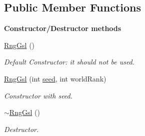 \subsection*{Public Member Functions}
\begin{Indent}{\bf Constructor/\-Destructor methods}\par
\begin{DoxyCompactItemize}
\item 
\hyperlink{class_q_u_e_s_o_1_1_rng_gsl_ace5a0dca9aa1655c3560602594b17074}{Rng\-Gsl} ()
\begin{DoxyCompactList}\small\item\em Default Constructor\-: it should not be used. \end{DoxyCompactList}\item 
\hyperlink{class_q_u_e_s_o_1_1_rng_gsl_a719078b54d621d51348b02c1fcac80c1}{Rng\-Gsl} (int \hyperlink{class_q_u_e_s_o_1_1_rng_base_a3094da86084e56faaae9325f1117f9a3}{seed}, int world\-Rank)
\begin{DoxyCompactList}\small\item\em Constructor with seed. \end{DoxyCompactList}\item 
\hyperlink{class_q_u_e_s_o_1_1_rng_gsl_a201a5c5a0805c8de61110736fef85b7d}{$\sim$\-Rng\-Gsl} ()
\begin{DoxyCompactList}\small\item\em Destructor. \end{DoxyCompactList}\end{DoxyCompactItemize}
\end{Indent}
